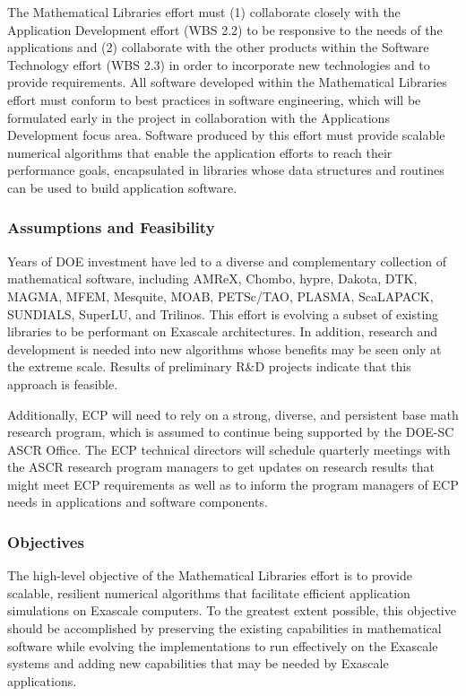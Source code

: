 The Mathematical Libraries effort must (1) collaborate closely with the Application Development effort (WBS 2.2) to be responsive to the needs of the applications and (2) collaborate with the other products within the Software Technology effort (WBS 2.3) in order to incorporate new technologies and to provide requirements. All software developed within the Mathematical Libraries effort must conform to best practices in software engineering, which will be formulated early in the project in collaboration with the Applications Development focus area. Software produced by this effort must provide scalable numerical algorithms that enable the application efforts to reach their performance goals, encapsulated in libraries whose data structures and routines can be used to build application software.

\subsubsection{Assumptions and Feasibility}
Years of DOE investment have led to a diverse and complementary collection of mathematical software, including AMReX, Chombo, hypre, Dakota, DTK, MAGMA, MFEM, Mesquite, MOAB, PETSc/TAO, PLASMA, ScaLAPACK, SUNDIALS, SuperLU, and Trilinos. This effort is evolving a subset of existing libraries to be performant on Exascale architectures. In addition, research and development is needed into new algorithms whose benefits may be seen only at the extreme scale. Results of preliminary R\&D projects indicate that this approach is feasible.

Additionally, ECP will need to rely on a strong, diverse, and persistent base math research program, which is assumed to continue being supported by the DOE-SC ASCR Office. The ECP technical directors will schedule quarterly meetings with the ASCR research program managers to get updates on research results that might meet ECP requirements as well as to inform the program managers of ECP needs in applications and software components.

\subsubsection{Objectives}
The high-level objective of the Mathematical Libraries effort is to provide scalable, resilient numerical algorithms that facilitate efficient application simulations on Exascale computers. To the greatest extent possible, this objective should be accomplished by preserving the existing capabilities in mathematical software while evolving the implementations to run effectively on the Exascale systems and adding new capabilities that may be needed by Exascale applications.

